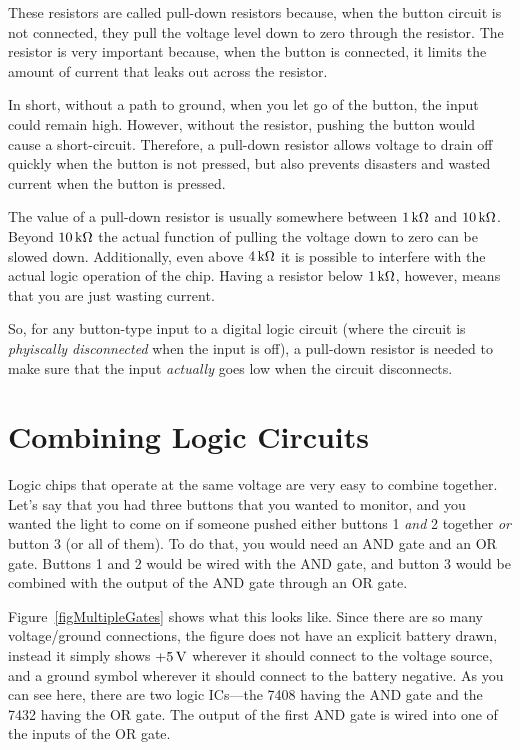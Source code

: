 These resistors are called pull-down resistors because, when the button circuit is not connected, they pull the voltage level down to zero through the resistor.
The resistor is very important because, when the button is connected, it limits the amount of current that leaks out across the resistor.

In short, without a path to ground, when you let go of the button, the input could remain high.
However, without the resistor, pushing the button would cause a short-circuit.
Therefore, a pull-down resistor allows voltage to drain off quickly when the button is not pressed, but also prevents disasters and wasted current when the button is pressed.

The value of a pull-down resistor is usually somewhere between $1\,\si{\kilo\ohm}$ and $10\,\si{\kilo\ohm}$.  
Beyond $10\,\si{\kilo\ohm}$ the actual function of pulling the voltage down to zero can be slowed down.  
Additionally, even above $4\,\si{\kilo\ohm}$ it is possible to interfere with the actual logic operation of the chip.
Having a resistor below $1\,\si{\kilo\ohm}$, however, means that you are just wasting current.

So, for any button-type input to a digital logic circuit (where the circuit is \emph{phyiscally disconnected} when the input is off), a pull-down resistor is needed to make sure that the input \emph{actually} goes low when the circuit disconnects.

\section{Combining Logic Circuits}

Logic chips that operate at the same voltage are very easy to combine together.
Let's say that you had three buttons that you wanted to monitor, and you wanted the light to come on if someone pushed either buttons 1 \emph{and} 2 together \emph{or} button 3 (or all of them).
To do that, you would need an AND gate and an OR gate.
Buttons 1 and 2 would be wired with the AND gate, and button 3 would be combined with the output of the AND gate through an OR gate.


Figure~\ref{figMultipleGates} shows what this looks like.
Since there are so many voltage/ground connections, the figure does not have an explicit battery drawn, instead it simply shows $+5\,\si{\volt}$ wherever it should connect to the voltage source, and a ground symbol wherever it should connect to the battery negative.
As you can see here, there are two logic ICs---the 7408 having the AND gate and the 7432 having the OR gate.
The output of the first AND gate is wired into one of the inputs of the OR gate.


